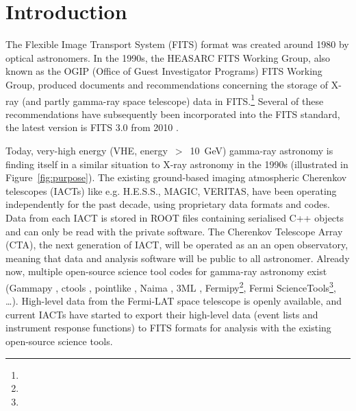 \section{Introduction}

The Flexible Image Transport System (FITS) format was created around 1980 \cite{Wells:1981} by optical astronomers. In the 1990s, the HEASARC FITS Working Group, also known as the OGIP (Office of Guest Investigator Programs) FITS Working Group, produced documents and recommendations concerning the storage of X-ray (and partly gamma-ray space telescope) data in FITS.\footnote{\ogip} Several of these recommendations have subsequently been incorporated into the FITS standard, the latest version is FITS 3.0 from 2010 \cite{Pence:2010}.

% 


Today, very-high energy (VHE, energy~$>$~10~GeV) gamma-ray astronomy is finding itself in a similar situation to X-ray astronomy in the 1990s (illustrated in Figure~\ref{fig:purpose}). The existing ground-based imaging atmospheric Cherenkov telescopes (IACTs) like e.g. H.E.S.S., MAGIC, VERITAS, have been operating independently for the past decade, using proprietary data formats and codes. Data from each IACT is stored in ROOT files containing serialised C++ objects and can only be read with the private software. The Cherenkov Telescope Array (CTA), the next generation of IACT, will be operated as an an open observatory, meaning that data and analysis software will be public to all astronomer. Already now, multiple open-source science tool codes for gamma-ray astronomy exist (Gammapy \cite{2015arXiv150907408D}, ctools \cite{2016AnA...593A...1K}, pointlike \citep{2010PhDT.......147K}, Naima \citep{2015arXiv150903319Z}, 3ML \citep{2015arXiv150708343V}, Fermipy\footnote{\fermipy}, Fermi ScienceTools\footnote{\fermist}, \ldots). High-level data from the Fermi-LAT space telescope is openly available, and current IACTs have started to export their high-level data (event lists and instrument response functions) to FITS formats for analysis with the existing open-source science tools.

